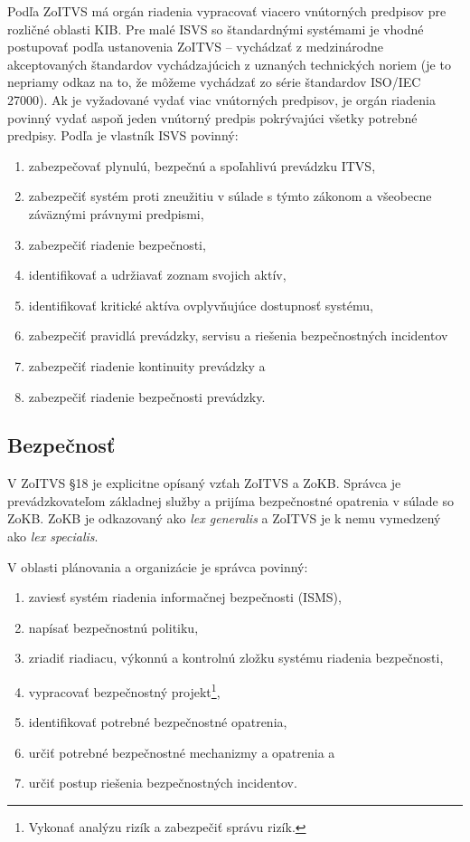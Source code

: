Podľa ZoITVS má orgán riadenia vypracovať viacero vnútorných predpisov pre rozličné oblasti KIB. Pre malé ISVS so štandardnými
systémami je vhodné postupovať podľa ustanovenia \acrshort{ZoITVS}\cite[\S 11, ods. (5)]{95/2019} -- vychádzať z medzinárodne
akceptovaných štandardov vychádzajúcich z uznaných technických noriem (je to nepriamy odkaz na to, že môžeme vychádzať zo série
štandardov ISO/IEC 27000). Ak je vyžadované vydať viac vnútorných predpisov, je orgán riadenia povinný vydať aspoň jeden
vnútorný predpis pokrývajúci všetky potrebné predpisy. Podľa \cite[\S 12 až \S 16]{95/2019} je
vlastník \acrshort{ISVS} povinný: 

\begin{enumerate}[-]
  \item zabezpečovať plynulú, bezpečnú a spoľahlivú prevádzku \acrshort{ITVS},
  \item zabezpečiť systém proti zneužitiu v súlade s týmto zákonom a všeobecne záväznými právnymi predpismi,
  \item zabezpečiť riadenie bezpečnosti,
  \item identifikovať a udržiavať zoznam svojich aktív,
  \item identifikovať kritické aktíva ovplyvňujúce dostupnosť systému,
  \item zabezpečiť pravidlá prevádzky, servisu a riešenia bezpečnostných incidentov
  \item zabezpečiť riadenie kontinuity prevádzky a
  \item zabezpečiť riadenie bezpečnosti prevádzky.
\end{enumerate}

\subsection{Bezpečnosť}
V \acrshort{ZoITVS} \S 18 je explicitne opísaný vzťah \acrshort{ZoITVS} a \acrshort{ZoKB}. Správca je prevádzkovateľom
základnej služby a prijíma bezpečnostné opatrenia v súlade so \acrshort{ZoKB}. \acrshort{ZoKB} je odkazovaný ako
\textit{lex generalis} a \acrshort{ZoITVS} je k nemu vymedzený ako \textit{lex specialis}.

V oblasti plánovania a organizácie\cite[\S 19 ods. (1)]{95/2019} je správca povinný: 

\begin{enumerate}[-]
  \item zaviesť systém riadenia informačnej bezpečnosti (\acrshort{ISMS}),
  \item napísať bezpečnostnú politiku,
  \item zriadiť riadiacu, výkonnú a kontrolnú zložku systému
    riadenia bezpečnosti,
  \item vypracovať bezpečnostný projekt\footnote{Vykonať analýzu rizík a zabezpečiť správu rizík.},
  \item identifikovať potrebné bezpečnostné opatrenia,
  \item určiť potrebné bezpečnostné mechanizmy a opatrenia a 
  \item určiť postup riešenia bezpečnostných incidentov.
\end{enumerate}

